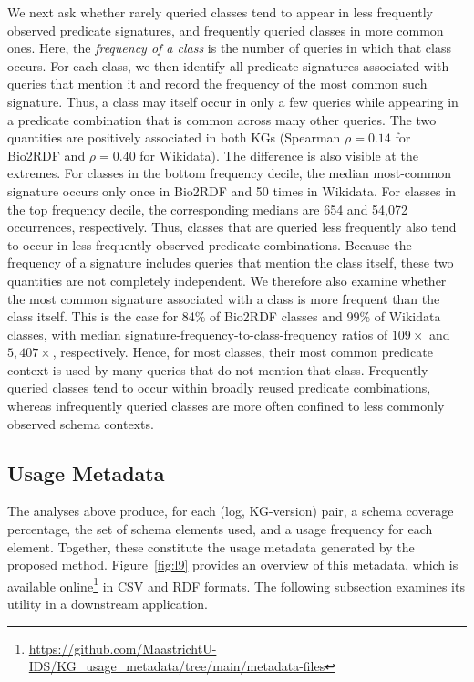 \documentclass[sw]{iosart2x}
\begin{document}
We next ask whether rarely queried classes tend to appear in less frequently observed predicate signatures, and frequently queried classes in more common ones. Here, the \emph{frequency of a class} is the number of queries in which that class occurs. For each class, we then identify all predicate signatures associated with queries that mention it and record the frequency of the most common such signature. Thus, a class may itself occur in only a few queries while appearing in a predicate combination that is common across many other queries.
The two quantities are positively associated in both KGs (Spearman $\rho = 0.14$ for Bio2RDF and $\rho = 0.40$ for Wikidata). The difference is also visible at the extremes. For classes in the bottom frequency decile, the median most-common signature occurs only once in Bio2RDF and 50 times in Wikidata. For classes in the top frequency decile, the corresponding medians are 654 and 54{,}072 occurrences, respectively. Thus, classes that are queried less frequently also tend to occur in less frequently observed predicate combinations.
Because the frequency of a signature includes queries that mention the class itself, these two quantities are not completely independent. We therefore also examine whether the most common signature associated with a class is more frequent than the class itself. This is the case for 84\% of Bio2RDF classes and 99\% of Wikidata classes, with median signature-frequency-to-class-frequency ratios of $109\times$ and $5{,}407\times$, respectively. Hence, for most classes, their most common predicate context is used by many queries that do not mention that class. Frequently queried classes tend to occur within broadly reused predicate combinations, whereas infrequently queried classes are more often confined to less commonly observed schema contexts.



\subsection{Usage Metadata}\label{sec:usagemetadata}
The analyses above produce, for each (log, KG-version) pair, a schema coverage percentage, the set of schema elements used, and a usage frequency for each element. Together, these constitute the usage metadata generated by the proposed method. Figure~\ref{fig:l9} provides an overview of this metadata, which is available online\footnote{\url{https://github.com/MaastrichtU-IDS/KG_usage_metadata/tree/main/metadata-files}} in CSV and RDF formats. The following subsection examines its utility in a downstream application.
\end{document}
